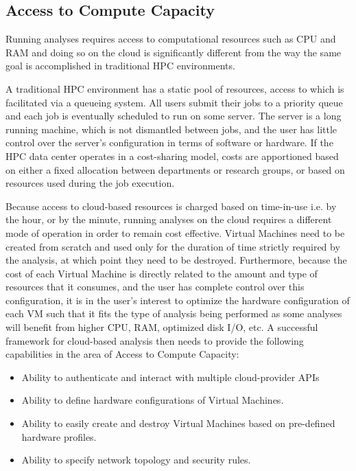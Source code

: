 \subsection {Access to Compute Capacity} \label{sec:access_to_compute_capacity}
Running analyses requires access to computational resources such as CPU and RAM and doing so on the cloud is significantly different from the way the same goal is accomplished in traditional HPC environments.

A traditional HPC environment has a static pool of resources, access to which is facilitated via a queueing system. All users submit their jobs to a priority queue and each job is eventually scheduled to run on some server. The server is a long running machine, which is not dismantled between jobs, and the user has little control over the server's configuration in terms of software or hardware. If the HPC data center operates in a cost-sharing model, costs are apportioned based on either a fixed allocation between departments or research groups, or based on resources used during the job execution.

Because access to cloud-based resources is charged based on time-in-use i.e. by the hour, or by the minute, running analyses on the cloud requires a different mode of operation in order to remain cost effective. Virtual Machines need to be created from scratch and used only for the duration of time strictly required by the analysis, at which point they need to be destroyed. Furthermore, because the cost of each Virtual Machine is directly related to the amount and type of resources that it consumes, and the user has complete control over this configuration, it is in the user's interest to optimize the hardware configuration of each VM such that it fits the type of analysis being performed as some analyses will benefit from higher CPU, RAM, optimized disk I/O, etc. A successful framework for cloud-based analysis then needs to provide the following capabilities in the area of Access to Compute Capacity:
\begin{itemize}
\item Ability to authenticate and interact with multiple cloud-provider APIs
\item Ability to define hardware configurations of Virtual Machines.
\item Ability to easily create and destroy Virtual Machines based on pre-defined hardware profiles.
\item Ability to specify network topology and security rules.
\end{itemize}

